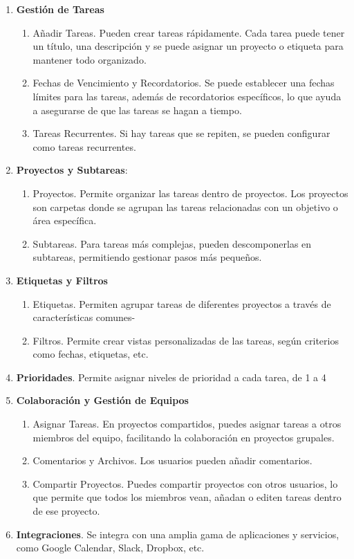 \begin{enumerate}
    \item \textbf{Gestión de Tareas}
    \begin{enumerate}
        \item Añadir Tareas. Pueden crear tareas rápidamente. Cada tarea puede tener un título, una descripción y se puede asignar un proyecto o etiqueta para mantener todo organizado.
        \item Fechas de Vencimiento y Recordatorios. Se puede establecer una fechas límites para las tareas, además de recordatorios específicos, lo que ayuda a asegurarse de que las tareas se hagan a tiempo.
        \item Tareas Recurrentes. Si hay tareas que se repiten, se pueden configurar como tareas recurrentes. 
    \end{enumerate}
    \item \textbf{Proyectos y Subtareas}: 
    \begin{enumerate}
        \item Proyectos. Permite organizar las tareas dentro de proyectos. Los proyectos son carpetas donde se agrupan las tareas relacionadas con un objetivo o área específica.
        \item Subtareas. Para tareas más complejas, pueden descomponerlas en subtareas, permitiendo gestionar pasos más pequeños. 
    \end{enumerate}
    \item \textbf{Etiquetas y Filtros}
    \begin{enumerate}
        \item Etiquetas. Permiten agrupar tareas de diferentes proyectos a través de características comunes-
        \item Filtros. Permite crear vistas personalizadas de las tareas, según criterios como fechas, etiquetas, etc.
    \end{enumerate}
    \item \textbf{Prioridades}. Permite asignar niveles de prioridad a cada tarea, de 1 a 4
    \item \textbf {Colaboración y Gestión de Equipos}
    \begin{enumerate}
        \item Asignar Tareas. En proyectos compartidos, puedes asignar tareas a otros miembros del equipo, facilitando la colaboración en proyectos grupales. 
        \item Comentarios y Archivos. Los usuarios pueden añadir comentarios.
        \item Compartir Proyectos. Puedes compartir proyectos con otros usuarios, lo que permite que todos los miembros vean, añadan o editen tareas dentro de ese proyecto.
    \end{enumerate}
    \item \textbf{Integraciones}. Se integra con una amplia gama de aplicaciones y servicios, como Google Calendar, Slack, Dropbox, etc.
\end{enumerate}

